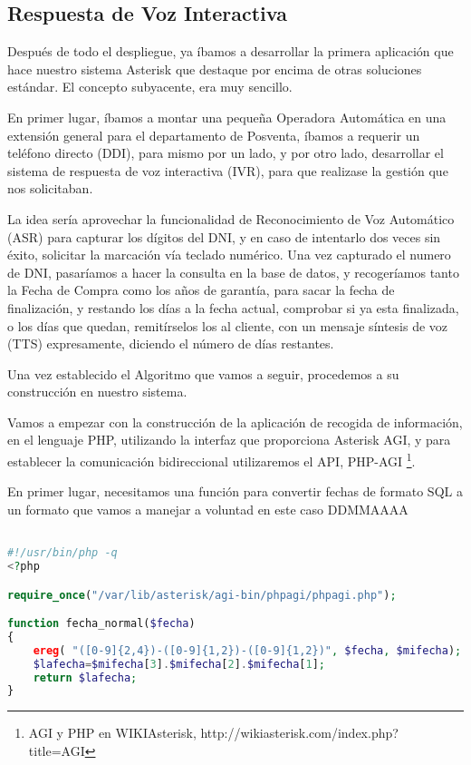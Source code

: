 \color[rgb]{0,0,0}

\newpage

\subsection{Respuesta de Voz Interactiva}

Después de todo el despliegue, ya íbamos a desarrollar la primera aplicación que hace nuestro sistema Asterisk que destaque por encima de otras soluciones estándar. El concepto subyacente, era muy sencillo.

En primer lugar, íbamos a montar una pequeña Operadora Automática en una extensión general para el departamento de Posventa, íbamos a requerir un teléfono directo (DDI), para mismo por un lado, y por otro lado, desarrollar el sistema de respuesta de voz interactiva (IVR), para que realizase la gestión que nos solicitaban.

La idea sería aprovechar la funcionalidad de Reconocimiento de Voz Automático (ASR) para capturar los dígitos del DNI, y en caso de intentarlo dos veces sin éxito, solicitar la marcación vía teclado numérico. Una vez capturado el numero de DNI, pasaríamos a hacer la consulta en la base de datos, y recogeríamos tanto la Fecha de Compra como los años de garantía, para sacar la fecha de finalización, y restando los días a la fecha actual, comprobar si ya esta finalizada, o los días que quedan, remitírselos los al cliente, con un mensaje síntesis de voz (TTS) expresamente, diciendo el número de días restantes.

Una vez establecido el Algoritmo que vamos a seguir, procedemos a su construcción en nuestro sistema.

Vamos a empezar con la construcción de la aplicación de recogida de información, en el lenguaje PHP, utilizando la interfaz que proporciona Asterisk AGI, y para establecer la comunicación bidireccional utilizaremos el API, PHP-AGI \footnote{AGI y PHP en WIKIAsterisk, http://wikiasterisk.com/index.php?title=AGI}.

En primer lugar, necesitamos una función para convertir fechas de formato SQL a un formato que vamos a manejar a voluntad en este caso DDMMAAAA

\begin{lstlisting}[language=php,title={/var/lib/asterisk/agi-bin/fingarantia.php}]

#!/usr/bin/php -q
<?php

require_once("/var/lib/asterisk/agi-bin/phpagi/phpagi.php");

function fecha_normal($fecha)
{
    ereg( "([0-9]{2,4})-([0-9]{1,2})-([0-9]{1,2})", $fecha, $mifecha);
    $lafecha=$mifecha[3].$mifecha[2].$mifecha[1];
    return $lafecha;
}

\end{lstlisting}

